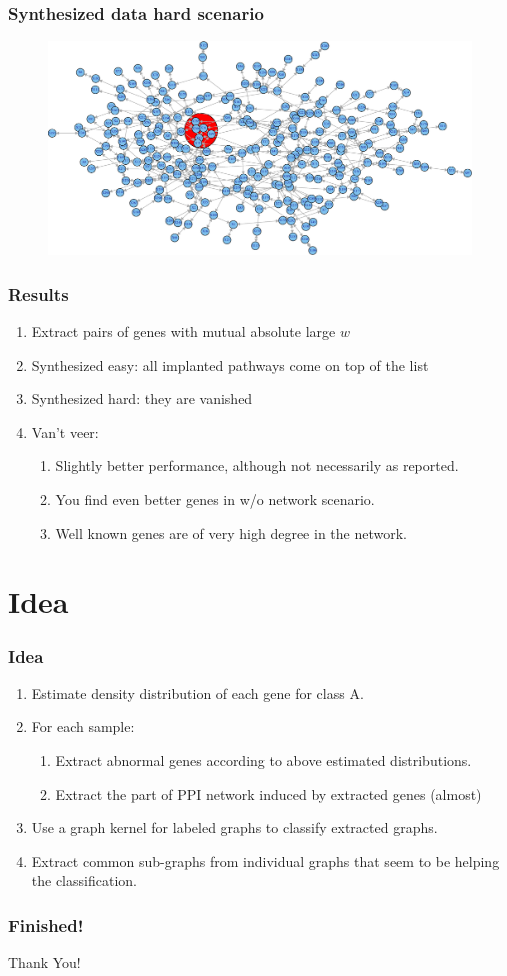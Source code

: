 \documentclass{beamer}
\begin{document}
\begin{frame}[plain]
\frametitle{Synthesized data hard scenario}
\begin{figure}
\includegraphics[scale=0.25]{synthesized-graph-hard}
\end{figure}
\end{frame}

\begin{frame}
\frametitle{Results}
\begin{enumerate}
\item Extract pairs of genes with mutual absolute large $w$ 
\item Synthesized easy: all implanted pathways come on top of the list 
\item Synthesized hard: they are vanished \pause
\item Van't veer: 
  \begin{enumerate}
    \item Slightly better performance, although not necessarily as reported.
    \item You find even better genes in w/o network scenario.
    \item Well known genes are of very high degree in the network.
  \end{enumerate}
\end{enumerate}
\end{frame}

\section{Idea}
\begin{frame}
\frametitle{Idea}
\begin{enumerate}
\item Estimate density distribution of each gene for class A. \pause
\item For each sample:
  \begin{enumerate}
  \item Extract abnormal genes according to above estimated distributions.
  \item Extract the part of PPI network induced by extracted genes (almost)
  \end{enumerate}\pause
\item Use a graph kernel for labeled graphs to classify extracted graphs. \pause
\item Extract common sub-graphs from individual graphs that seem to be helping the classification.
\end{enumerate}
\end{frame}

\begin{frame}[plain]
\frametitle{Finished!}
  \begin{center}
    \Huge{Thank You!}
  \end{center}
\end{frame}
\end{document}
